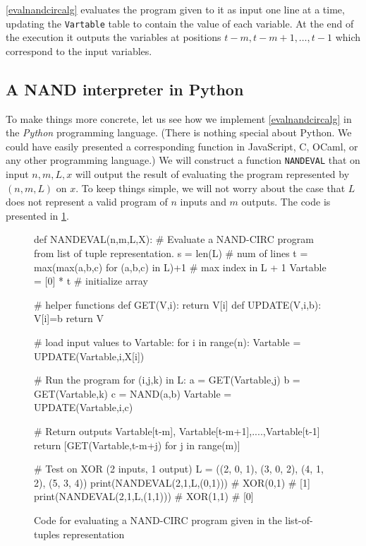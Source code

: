 \cref{evalnandcircalg} evaluates the program given to it as input one
line at a time, updating the \texttt{Vartable} table to contain the
value of each variable. At the end of the execution it outputs the
variables at positions \(t-m,t-m+1,\ldots,t-1\) which correspond to the
input variables.

\subsection{A NAND interpreter in Python}\label{nandevalpythonsec}

To make things more concrete, let us see how we implement
\cref{evalnandcircalg} in the \emph{Python} programming language. (There
is nothing special about Python. We could have easily presented a
corresponding function in JavaScript, C, OCaml, or any other programming
language.) We will construct a function \texttt{NANDEVAL} that on input
\(n,m,L,x\) will output the result of evaluating the program represented
by \((n,m,L)\) on \(x\). To keep things simple, we will not worry about
the case that \(L\) does not represent a valid program of \(n\) inputs
and \(m\) outputs. The code is presented in \cref{nandevalcode}.

\begin{figure}

\classiccaptionstyle
\caption{Code for evaluating a NAND-CIRC program given in the list-of-tuples representation}
\label{nandevalcode}

\begin{framedcode}
def NANDEVAL(n,m,L,X):
    # Evaluate a NAND-CIRC program from list of tuple representation.
    s = len(L) # num of lines
    t = max(max(a,b,c) for (a,b,c) in L)+1 # max index in L + 1
    Vartable = [0] * t # initialize array

    # helper functions
    def GET(V,i): return V[i]
    def UPDATE(V,i,b):
        V[i]=b
        return V

    # load input values to Vartable:
    for i in range(n):
        Vartable = UPDATE(Vartable,i,X[i])

    # Run the program
    for (i,j,k) in L:
        a = GET(Vartable,j)
        b = GET(Vartable,k)
        c = NAND(a,b)
        Vartable = UPDATE(Vartable,i,c)

    # Return outputs Vartable[t-m], Vartable[t-m+1],....,Vartable[t-1]
    return [GET(Vartable,t-m+j) for j in range(m)]

# Test on XOR (2 inputs, 1 output)
L = ((2, 0, 1), (3, 0, 2), (4, 1, 2), (5, 3, 4))
print(NANDEVAL(2,1,L,(0,1))) # XOR(0,1)
# [1]
print(NANDEVAL(2,1,L,(1,1))) # XOR(1,1)
# [0]
\end{framedcode}
\end{figure}

